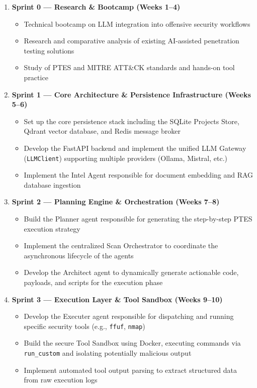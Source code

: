 \documentclass[12pt,a4paper]{report}
\begin{document}
\begin{enumerate}
    \item \textbf{Sprint 0 --- Research \& Bootcamp (Weeks 1--4)}
\begin{itemize}
    \item Technical bootcamp on LLM integration into offensive security workflows
    \item Research and comparative analysis of existing AI-assisted penetration
    testing solutions
    \item Study of PTES and MITRE ATT\&CK standards and hands-on tool practice
\end{itemize}

    \item \textbf{Sprint 1 --- Core Architecture \& Persistence Infrastructure (Weeks 5--6)}
    \begin{itemize}
        \item Set up the core persistence stack including the SQLite Projects Store,
        Qdrant vector database, and Redis message broker
        \item Develop the FastAPI backend and implement the unified LLM Gateway
        (\texttt{LLMClient}) supporting multiple providers (Ollama, Mistral, etc.)
        \item Implement the Intel Agent responsible for document embedding and RAG
        database ingestion
    \end{itemize}

    \item \textbf{Sprint 2 --- Planning Engine \& Orchestration (Weeks 7--8)}
    \begin{itemize}
        \item Build the Planner agent responsible for generating the step-by-step
        PTES execution strategy
        \item Implement the centralized Scan Orchestrator to coordinate the
        asynchronous lifecycle of the agents
        \item Develop the Architect agent to dynamically generate actionable code,
        payloads, and scripts for the execution phase
    \end{itemize}

    \item \textbf{Sprint 3 --- Execution Layer \& Tool Sandbox (Weeks 9--10)}
    \begin{itemize}
        \item Develop the Executer agent responsible for dispatching and running
        specific security tools (e.g., \texttt{ffuf}, \texttt{nmap})
        \item Build the secure Tool Sandbox using Docker, executing commands via
        \texttt{run\_custom} and isolating potentially malicious output
        \item Implement automated tool output parsing to extract structured data
        from raw execution logs
    \end{itemize}


\end{enumerate}
\end{document}
